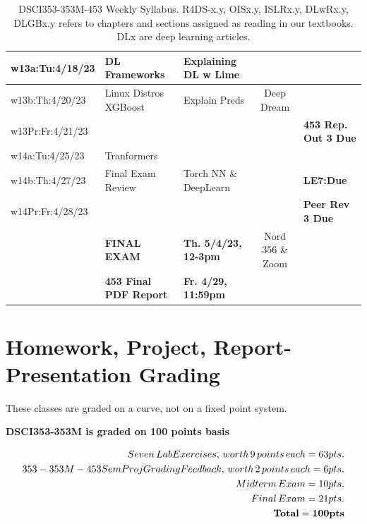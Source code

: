 \documentclass[10pt]{article} %
\begin{document}
\begin{table}[h]
\begin{tabular}{| l | p{3.9cm} | p{3.7cm} | c | p{2.8cm} |}
    \hline
    \hline
    w13a:Tu:4/18/23 & DL Frameworks & Explaining DL w Lime &  & \\
    \hline
    w13b:Th:4/20/23 & Linux Distros XGBoost & Explain Preds & Deep Dream & \\
    \hline
    w13Pr:Fr:4/21/23 &  & &  & {\bf 453 Rep. Out 3 Due} \\
    \hline
    \hline
    w14a:Tu:4/25/23 & Tranformers &  &  &  \\
    \hline
    w14b:Th:4/27/23 & Final Exam Review & Torch NN \& DeepLearn  &  & {\bf LE7:Due} \\
    \hline
    w14Pr:Fr:4/28/23 &  & &  & {\bf Peer Rev 3 Due} \\
    \hline
    \hline
    & {\bf FINAL EXAM} & {\bf Th. 5/4/23, 12-3pm} & Nord 356 \& Zoom & \\
    \hline
    \hline
    & {\bf 453 Final PDF Report} & {\bf Fr. 4/29, 11:59pm} & & \\
    \hline
  \end{tabular}
  \caption{DSCI353-353M-453 Weekly Syllabus. R4DS-x.y, OISx.y, ISLRx.y, DLwRx.y, DLGBx.y refers to chapters and sections assigned as reading in our textbooks. DLx are deep learning articles. }
  \label{table:Syllabus2} %
\end{table}

\FloatBarrier

\section{Homework, Project, Report-Presentation Grading}

  These classes are graded on a curve, not on a fixed point system.

  {\bf DSCI353-353M is graded on 100 points basis}

  \begin{align*}
    Seven \, Lab Exercises, \, worth \, 9 \, points \, each = 63 pts. \\
    353-353M-453 SemProj Grading Feedback, \, worth \, 2 \, points \, each = 6 pts. \\
    Midterm \, Exam = 10 pts. \\
    Final \, Exam = 21 pts. \\
    {\bf Total = 100 pts}
  \end{align*}
\end{document}

